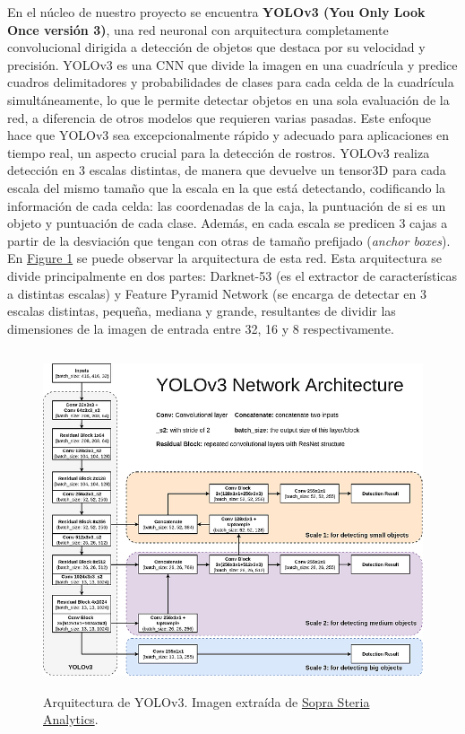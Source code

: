 \documentclass[10pt,twocolumn,letterpaper]{article}
\begin{document}
En el núcleo de nuestro proyecto se encuentra \textbf{YOLOv3 (You Only Look Once versión 3)}, una red neuronal con arquitectura completamente convolucional dirigida a detección de objetos que destaca por su velocidad y precisión. YOLOv3 es una CNN que divide la imagen en una cuadrícula y predice cuadros delimitadores 
y probabilidades de clases para cada celda de la cuadrícula simultáneamente, lo que le permite detectar objetos en una sola evaluación de la red, a diferencia de otros modelos que requieren varias pasadas. Este enfoque hace que YOLOv3 sea excepcionalmente rápido 
y adecuado para aplicaciones en tiempo real, un aspecto crucial para la detección de rostros. YOLOv3 realiza detección en 3 escalas distintas, de manera que devuelve un tensor3D para cada escala del mismo tamaño que la escala en la que está detectando, codificando la información de cada celda: las coordenadas de la caja, la puntuación de si es un objeto y puntuación de cada clase. Además, en cada escala se predicen 3 cajas a partir de la desviación que tengan con otras de tamaño prefijado (\textit{anchor boxes}).  En \hyperref[fig:fig1]{Figure 1} se puede observar la arquitectura de esta red. Esta arquitectura se divide principalmente en dos partes: Darknet-53 (es el extractor de características a distintas escalas) y Feature Pyramid Network (se encarga de detectar en 3 escalas distintas, pequeña, mediana y grande, resultantes de dividir las dimensiones de la imagen de entrada entre 32, 16 y 8 respectivamente.

\begin{figure}[htbp]
\centering
\includegraphics[width=\textwidth, height=10cm, keepaspectratio]{3.png}
\caption{Arquitectura de YOLOv3. Imagen extraída de \href{https://soprasteriaanalytics.se/2019/04/25/understanding-object-detection-using-yolo-and-training-for-new-objects-part-1/} {Sopra Steria Analytics}.}
\label{fig:fig1}
\end{figure}
\end{document}
